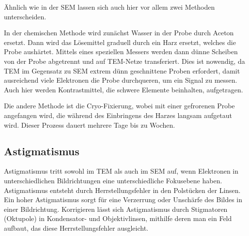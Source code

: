Ähnlich wie in der SEM lassen sich auch hier vor allem zwei Methoden unterscheiden.\cite{MyScope}

In der chemischen Methode wird zunächst Wasser in der Probe durch Aceton ersetzt.
Dann wird das Lösemittel graduell durch ein Harz ersetzt, welches die Probe aushärtet.
Mittels eines speziellen Messers werden dann dünne Scheiben von der Probe abgetrennt und auf TEM-Netze transferiert.
Dies ist nowendig, da TEM im Gegensatz zu SEM extrem dünn geschnittene Proben erfordert, damit ausreichend viele Elektronen die Probe durchqueren, um ein Signal zu messen. %
Auch hier werden Kontrastmittel, die schwere Elemente beinhalten, aufgetragen.

Die andere Methode ist die Cryo-Fixierung, wobei mit einer gefrorenen Probe angefangen wird, die während des Einbringens des Harzes langsam aufgetaut wird.
Dieser Prozess dauert mehrere Tage bis zu Wochen.



\subsection{Astigmatismus}

Astigmatismus tritt sowohl im TEM als auch im SEM auf, wenn Elektronen in unterschiedlichen Bildrichtungen eine unterschiedliche Fokusebene haben.
Astigmatismus entsteht durch Herrstellungsfehler in den Polstücken der Linsen.
Ein hoher Astigmatismus sorgt für eine Verzerrung oder Unschärfe des Bildes in einer Bildrichtung. \cite{MyScope}
Korrigieren lässt sich Astigmatismus durch Stigmatoren (Oktupole) in Kondensator- und Objektivlinsen, mithilfe deren man ein Feld aufbaut, das diese Herrstellungsfehler ausgleicht.




